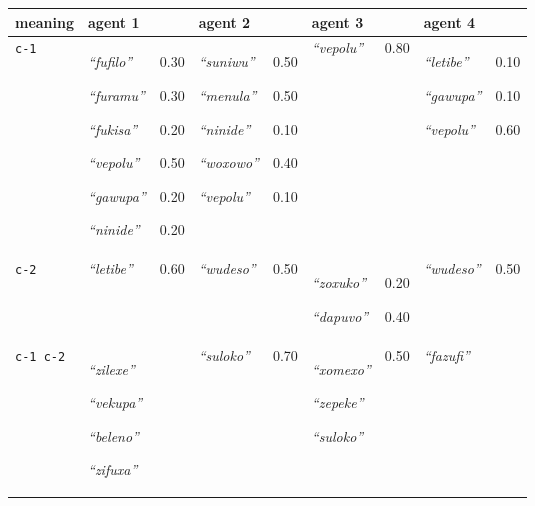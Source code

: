
{\footnotesize\renewcommand{\arraystretch}{1.5}
\begin{tabular}{@{}p{1.2cm}|p{1.6cm}@{}p{0.8cm}@{}|p{1.6cm}@{}p{0.8cm}@{}|p{1.6cm}@{}p{0.8cm}@{}|p{1.6cm}@{}p{0.8cm}@{}}
meaning & agent 1 &  & agent 2 &  & agent 3 &  & agent 4 & \\
\hline
\texttt{c-1}&\textit{``fufilo''}


\textit{``furamu''}


\textit{``fukisa''}


\textit{``vepolu''}


\textit{``gawupa''}


\textit{``ninide''}
&0.30

0.30

0.20

0.50

0.20

0.20&\textit{``suniwu''}


\textit{``menula''}


\textit{``ninide''}


\textit{``woxowo''}


\textit{``vepolu''}
&0.50

0.50

0.10

0.40

0.10&\textit{``vepolu''}
&0.80&\textit{``letibe''}


\textit{``gawupa''}


\textit{``vepolu''}
&0.10

0.10

0.60\\
\hline
\texttt{c-2}&\textit{``letibe''}
&0.60&\textit{``wudeso''}
&0.50&\textit{``zoxuko''}


\textit{``dapuvo''}
&0.20

0.40&\textit{``wudeso''}
&0.50\\
\hline
\texttt{c-1 c-2}&\textit{``zilexe''}


\textit{``vekupa''}


\textit{``beleno''}


\textit{``zifuxa''}
&&\textit{``suloko''}
&0.70&\textit{``xomexo''}


\textit{``zepeke''}


\textit{``suloko''}
&0.50&\textit{``fazufi''}
&
\end{tabular}}
